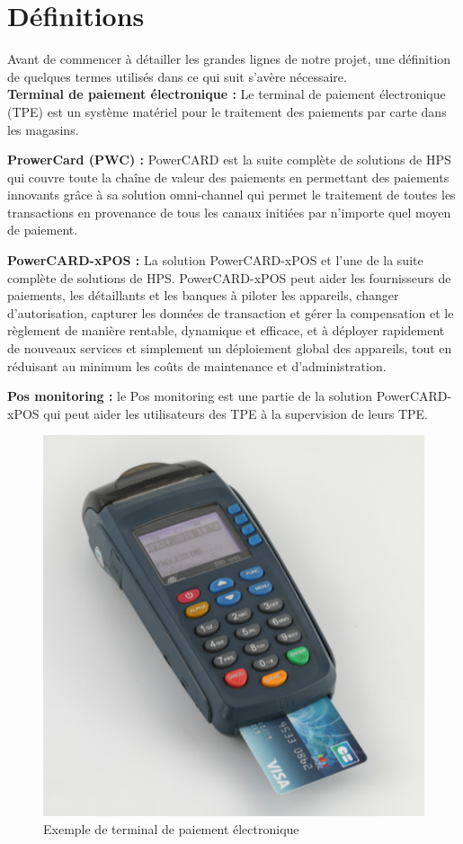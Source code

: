 \section{Définitions}
Avant de commencer à détailler les grandes lignes de notre projet, une définition de quelques termes utilisés dans ce qui suit s'avère nécessaire.
\\

\textbf{Terminal de paiement électronique :} Le terminal de paiement électronique (TPE) est un système matériel pour le traitement des paiements par carte dans les magasins. 

%


\textbf{ProwerCard (PWC) :} PowerCARD est la suite complète de solutions de HPS qui couvre toute la chaîne de valeur des paiements en permettant des paiements innovants grâce à sa solution omni-channel qui permet le traitement de toutes les transactions en provenance de tous les canaux initiées par n'importe quel moyen de paiement.

\textbf{PowerCARD-xPOS :} La solution PowerCARD-xPOS et l'une de la suite complète de solutions de HPS. PowerCARD-xPOS peut aider les fournisseurs de paiements, les détaillants et les banques à piloter les appareils, changer d'autorisation, capturer les données de transaction et gérer la compensation et le règlement de manière rentable, dynamique et efficace, et à déployer rapidement de nouveaux services et simplement un déploiement global des appareils, tout en réduisant au minimum les coûts de maintenance et d'administration.

\textbf{Pos monitoring :} le Pos monitoring est une partie de la solution PowerCARD-xPOS qui peut aider les utilisateurs des TPE à la supervision de leurs TPE.


\begin{figure}[h!]  
  \centering
    \includegraphics[width=0.9 \textwidth]{chapitre2/Figures/fdt.png}
  \caption{Exemple de terminal de paiement électronique}
\end{figure}
\newpage